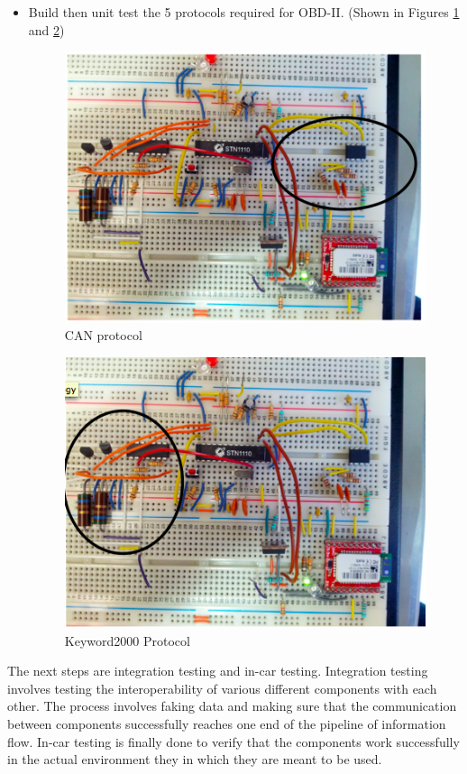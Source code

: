 \documentclass[12pt,letterpaper]{article}
\begin{document}
\begin{itemize}
\item Build then unit test the 5 protocols required for OBD-II. (Shown in Figures \ref{fig:canprotocol} and \ref{fig:kwprotocol})
\begin{figure}[H]
\centering
\includegraphics[page=1, totalheight=7cm]{images/canprotocol.png}
\caption{CAN protocol}
\label{fig:canprotocol}
\end{figure}\begin{figure}[H]
\centering
\includegraphics[page=1, totalheight=7cm]{images/kwp.png}
\caption{Keyword2000 Protocol}
\label{fig:kwprotocol}
\end{figure}
\end{itemize}

The next steps are integration testing and in-car testing. Integration testing involves testing the interoperability of various different components with each other. The process involves faking data and making sure that the communication between components successfully reaches one end of the pipeline of information flow. In-car testing is finally done to verify that the components work successfully in the actual environment they in which they are meant to be used.
\end{document}
